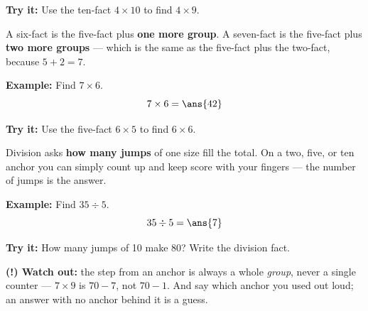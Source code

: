 \documentclass[12pt]{article}
\begin{document}
\begin{tryitbox}
\textbf{Try it:} Use the ten-fact $4 \times 10$ to find $4 \times 9$.\\[2pt]
\end{tryitbox}


\begin{formulabox}
A six-fact is the five-fact plus \textbf{one more group}. A seven-fact is the
five-fact plus \textbf{two more groups} --- which is the same as the five-fact
plus the two-fact, because $5 + 2 = 7$.
\end{formulabox}

\begin{examplebox}
\textbf{Example:} Find $7 \times 6$.
\[ 7 \times 6 = \ans{42} \]
\end{examplebox}

\begin{tryitbox}
\textbf{Try it:} Use the five-fact $6 \times 5$ to find $6 \times 6$.\\[2pt]
\end{tryitbox}


\begin{formulabox}
Division asks \textbf{how many jumps} of one size fill the total. On a two,
five, or ten anchor you can simply count up and keep score with your fingers ---
the number of jumps is the answer.
\end{formulabox}

\begin{examplebox}
\textbf{Example:} Find $35 \div 5$.
\[ 35 \div 5 = \ans{7} \]
\end{examplebox}

\begin{tryitbox}
\textbf{Try it:} How many jumps of 10 make 80? Write the division fact.\\[2pt]
\end{tryitbox}

\begin{watchoutbox}
\textbf{(!) Watch out:} the step from an anchor is always a whole \emph{group},
never a single counter --- $7 \times 9$ is $70 - 7$, not $70 - 1$. And say which
anchor you used out loud; an answer with no anchor behind it is a guess.
\end{watchoutbox}
\end{document}
